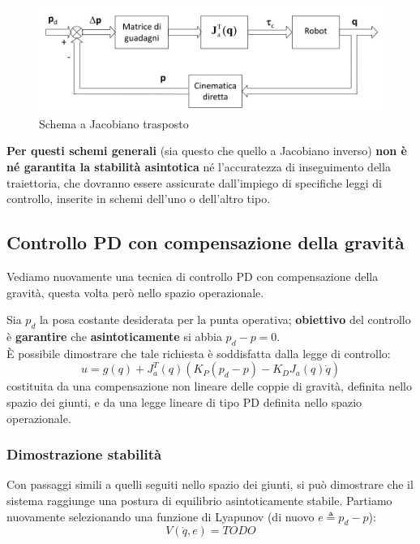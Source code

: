 \begin{figure}[H]
	\centering
	\includegraphics[width=0.7\linewidth]{images/operational_space_control_jac_trasp}
	\caption{Schema a Jacobiano trasposto}
	\label{fig:operationalspacecontroljactrasp}
\end{figure}


\textbf{Per questi schemi generali} (sia questo che quello a Jacobiano inverso) \textbf{non è né garantita la stabilità asintotica} né l’accuratezza di inseguimento della traiettoria, che dovranno essere assicurate dall’impiego di specifiche leggi di controllo, inserite in schemi dell’uno o dell’altro tipo.






\subsection{Controllo PD con compensazione della gravità}
Vediamo nuovamente una tecnica di controllo PD con compensazione della gravità, questa volta però nello spazio operazionale.

Sia $p_d$ la posa costante desiderata per la punta operativa; \textbf{obiettivo} del controllo è \textbf{garantire} che \textbf{asintoticamente} si abbia $p_d - p = 0$.\\
È possibile dimostrare che tale richiesta è soddisfatta dalla legge di controllo:
$$
u = g(q) + J_a^T(q)(K_P(p_d - p) - K_DJ_a(q)\dot{q})
$$
costituita da una compensazione non lineare delle coppie di gravità, definita nello spazio dei giunti, e da una legge lineare di tipo PD definita nello spazio operazionale.

\subsubsection{Dimostrazione stabilità}
Con passaggi simili a quelli seguiti nello spazio dei giunti, si può dimostrare che il sistema raggiunge una postura di equilibrio asintoticamente stabile.
Partiamo nuovamente selezionando una funzione di Lyapunov (di nuovo $e \triangleq p_d - p$):
$$
V(\dot{q}, e) = TODO
$$